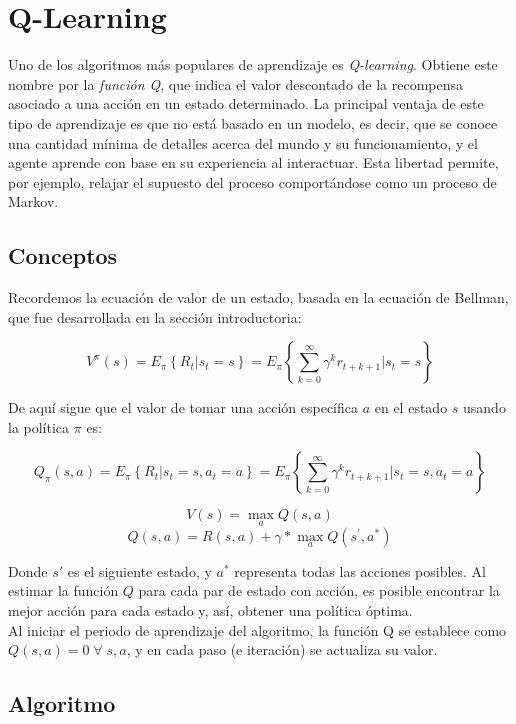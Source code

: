 \section{Q-Learning}

Uno de los algoritmos m\'as populares de aprendizaje es \textit{Q-learning}. Obtiene este nombre por la \textit{funci\'on Q}, que indica el valor descontado de la recompensa asociado a una acci\'on en un estado determinado. La principal ventaja de este tipo de aprendizaje es que no est\'a basado en un modelo, es decir, que se conoce una cantidad m\'inima de detalles acerca del mundo y su funcionamiento, y el agente aprende con base en su experiencia al interactuar. Esta libertad permite, por ejemplo, relajar el supuesto del proceso comport\'andose como un proceso de Markov.

\subsection{Conceptos}

Recordemos la ecuaci\'on de valor de un estado, basada en la ecuaci\'on de Bellman, que fue desarrollada en la secci\'on introductoria:

$$
V^{\pi}(s) = E_{\pi}\left\{R_{t}|s_{t} = s\right\} = E_{\pi}\left\{\sum_{k=0}^{\infty}\gamma^{k}r_{t+k+1}|s_{t}=s\right\}
$$

De aqu\'i sigue que el valor de tomar una acci\'on espec\'ifica $a$ en el estado $s$ usando la pol\'itica $\pi$ es:

$$
    Q_{\pi}(s,a) = E_{\pi}\left\{R_{t}|s_{t}=s,a_{t}=a\right\}=E_{\pi}\left \{\sum_{k = 0}^{\infty}\gamma^{k}r_{t+k+1}|s_{t} =s, a_{t} =a  \right \}
$$

$$
V(s) = \max_{a}{Q(s,a)}
$$
$$
Q(s, a) = R(s, a) + \gamma * \max_{a}{Q(s^{'}, a^{*})}
$$

Donde $s{'}$ es el siguiente estado, y $a^{*}$ representa todas las acciones posibles. Al estimar la funci\'on $Q$ para cada par de estado con acci\'on, es posible encontrar la mejor acci\'on para cada estado y, as\'i, obtener una pol\'itica \'optima.\\

Al iniciar el periodo de aprendizaje del algoritmo, la funci\'on Q se establece como $Q(s,a) = 0 \; \forall \; s, a$, y en cada paso (e iteraci\'on) se actualiza su valor.

\subsection{Algoritmo}

